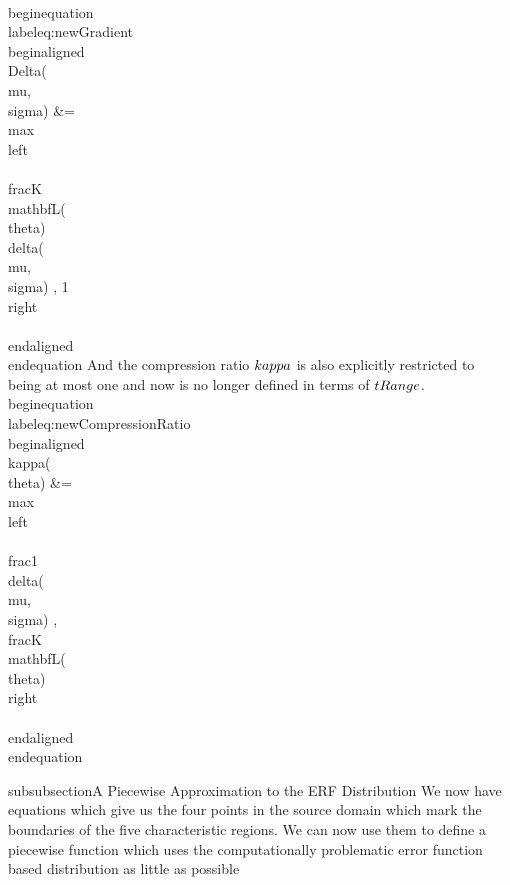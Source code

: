 \\begin{equation}\\label{eq:newGradient}
\\begin{aligned}
\\Delta(\\mu,\\sigma) 
&= \\max\\left\\{ \\frac{K}{\\mathbf{L}(\\theta)}   \\delta(\\mu,\\sigma) , 1 \\right\\}
\\end{aligned}
\\end{equation}
And the compression ratio $\\kappa$ is also explicitly restricted to being at most one and now is no longer defined in terms of $\\tRange$.
\\begin{equation}\\label{eq:newCompressionRatio}
\\begin{aligned}
\\kappa(\\theta) 
&= \\max\\left\\{ \\frac{1}{\\delta(\\mu,\\sigma) }   , \\frac{K}{\\mathbf{L}(\\theta)} \\right\\}   
\\end{aligned}
\\end{equation}




subsubsection{A Piecewise Approximation to the ERF Distribution}
We now have equations which give us the four points in the source domain which mark the boundaries of the five characteristic regions. We can now use them to define a piecewise function which uses the computationally problematic error function based distribution as little as possible

